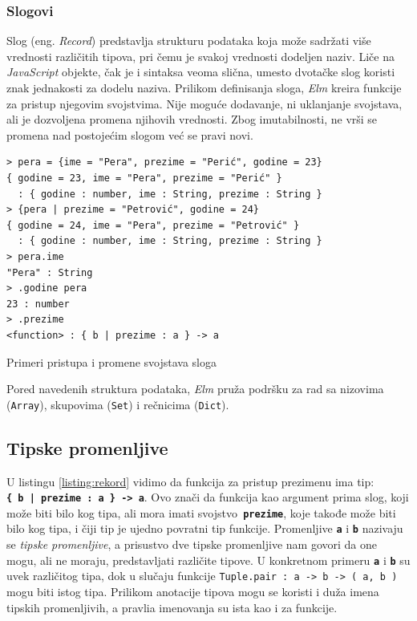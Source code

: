 \documentclass[12pt,oneside]{memoir}
\begin{document}
\subsubsection{Slogovi} 
Slog (eng. \emph{Record}) predstavlja strukturu podataka koja može sadržati više vrednosti različitih tipova, 
pri čemu je svakoj vrednosti dodeljen naziv. Liče na \emph{JavaScript} objekte, čak je i 
sintaksa veoma slična, umesto dvotačke slog koristi znak jednakosti za dodelu naziva.
Prilikom definisanja sloga, \emph{Elm} kreira funkcije za pristup njegovim svojstvima. Nije 
moguće dodavanje, ni uklanjanje svojstava, ali je dozvoljena promena njihovih vrednosti.
Zbog imutabilnosti, ne vrši se promena nad postojećim slogom već se pravi novi.
\begin{listing}[h]
\begin{verbatim}
> pera = {ime = "Pera", prezime = "Perić", godine = 23}
{ godine = 23, ime = "Pera", prezime = "Perić" } 
  : { godine : number, ime : String, prezime : String }
> {pera | prezime = "Petrović", godine = 24}
{ godine = 24, ime = "Pera", prezime = "Petrović" }
  : { godine : number, ime : String, prezime : String }
> pera.ime
"Pera" : String
> .godine pera
23 : number
> .prezime
<function> : { b | prezime : a } -> a
\end{verbatim}
\caption{Primeri pristupa i promene svojstava sloga}
\label{listing:rekord}
\end{listing}

Pored navedenih struktura podataka, \emph{Elm} pruža podršku za rad sa nizovima (\texttt{Array}),
skupovima (\texttt{Set}) i rečnicima (\texttt{Dict}).

\subsection{Tipske promenljive} 
U listingu \ref{listing:rekord} vidimo da funkcija za pristup prezimenu ima tip:\\ 
\texttt{\textbf{\{ b | prezime : a \} -> a}}. Ovo znači da funkcija kao argument
prima slog, koji može biti bilo kog tipa, ali mora imati svojstvo\texttt{\textbf{
prezime}}, koje takođe može biti bilo kog tipa, i čiji tip je ujedno povratni tip 
funkcije. Promenljive \texttt{\textbf{a}} i \texttt{\textbf{b}} nazivaju se 
\emph{tipske promenljive}, a prisustvo dve tipske promenljive nam govori da one mogu, 
ali ne moraju, predstavljati različite tipove. U konkretnom primeru \texttt{\textbf{a}}
i \texttt{\textbf{b}} su uvek različitog tipa, dok u slučaju funkcije \texttt{Tuple.pair
: a -> b -> ( a, b )} mogu biti istog tipa. Prilikom anotacije tipova mogu se koristi i
duža imena tipskih promenljivih, a pravlia imenovanja su ista kao i za funkcije.
\end{document}
